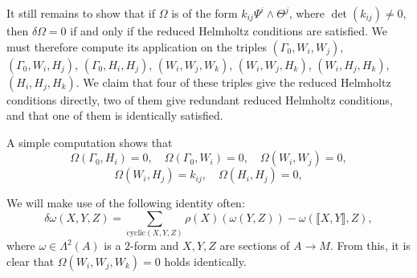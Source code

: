\documentclass[11pt]{article}
\theoremstyle{plain}
\theoremstyle{definition}
\begin{document}
It still remains to show that if $\Omega$ is of the form $k_{ij}\Psi^i\wedge \Theta^j$, where $\det(k_{ij})\neq 0$, then $\delta \Omega=0$ if and only  if the reduced Helmholtz conditions are satisfied. We must therefore compute its application on the triples $(\Gamma_0,W_i,W_j)$, $(\Gamma_0,W_i,H_j)$, $(\Gamma_0,H_i,H_j)$, $(W_i,W_j,W_k)$, $(W_i,W_j,H_k)$, $(W_i,H_j,H_k)$, $(H_i,H_j,H_k)$. We claim that four of these triples give the reduced Helmholtz conditions directly, two of them give redundant reduced Helmholtz conditions, and that one of them is identically satisfied.

A simple computation shows that
\begin{equation*}
    \Omega(\Gamma_0,H_i)=0,\quad \Omega(\Gamma_0,W_i)=0,\quad \Omega(W_i,W_j)=0,
\end{equation*}
\begin{equation*}
    \Omega(W_i,H_j)=k_{ij},\quad \Omega(H_i,H_j)=0,
\end{equation*}

We will make use of the following identity often:
\begin{equation*}
    \delta \omega(X,Y,Z)=\sum_{\mathrm{cyclic}(X,Y,Z)} \rho(X)(\omega(Y,Z))-\omega(\llbracket X,Y\rrbracket,Z),
\end{equation*}
where $\omega\in \Lambda^2(A)$ is a $2$-form and $X,Y,Z$ are sections of $A\to M$. From this, it is clear that $\Omega(W_i,W_j,W_k)=0$ holds identically.
\end{document}
